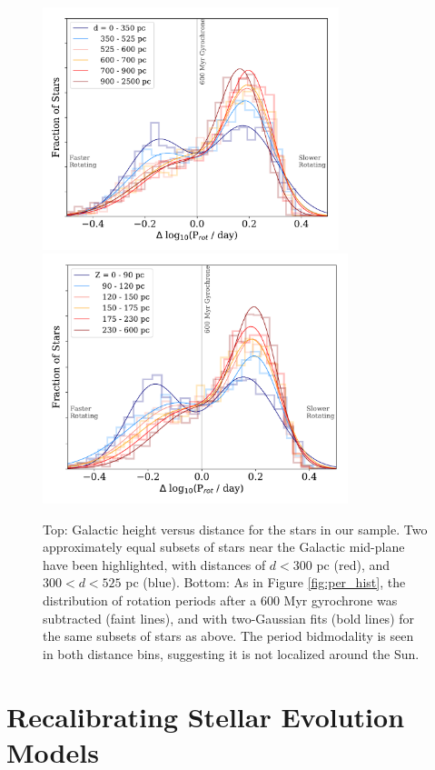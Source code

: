\documentclass[preprint2]{aastex62}
\begin{document}
\begin{figure}[!ht]
\centering
\includegraphics[width=3.4in]{fig4a}
\includegraphics[width=3.5in]{fig4b}
\caption{
Top: Galactic height versus distance for the stars in our sample. Two approximately equal subsets of stars near the Galactic mid-plane have been highlighted, with distances of $d<300$ pc (red), and $300<d<525$ pc (blue).
Bottom: As in Figure \ref{fig:per_hist}, the distribution of rotation periods after a 600 Myr gyrochrone was subtracted (faint lines), and with two-Gaussian fits (bold lines) for the same subsets of stars as above. The period bidmodality is seen in both distance bins, suggesting it is not localized around the Sun.
}
\label{fig:dZ}
\end{figure}




\section{Recalibrating Stellar Evolution Models}
\end{document}
